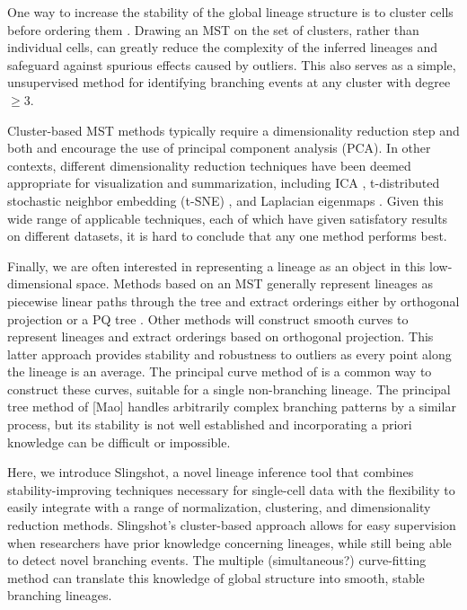 \documentclass[11pt]{article}\usepackage[]{graphicx}\usepackage[]{color}
\begin{document}
One way to increase the stability of the global lineage structure is to cluster cells before ordering them \citep{Ji&Ji16,Shinetal15}. Drawing an MST on the set of clusters, rather than individual cells, can greatly reduce the complexity of the inferred lineages and safeguard against spurious effects caused by outliers. This also serves as a simple, unsupervised method for identifying branching events at any cluster with degree $\geq 3$.

 Cluster-based MST methods typically require a dimensionality reduction step and both \citet{Ji&Ji16} and \citet{Shinetal15} encourage the use of principal component analysis (PCA). In other contexts, different dimensionality reduction techniques have been deemed appropriate for visualization and summarization, including ICA \citep{Trapnelletal14}, t-distributed stochastic neighbor embedding (t-SNE) \citep{Bendalletal14,Petropoulosetal16}, and Laplacian eigenmaps \citep{Campbelletal15}. Given this wide range of applicable techniques, each of which have given satisfatory results on different datasets, it is hard to conclude that any one method performs best.

 Finally, we are often interested in representing a lineage as an object in this low-dimensional space. Methods based on an MST generally represent lineages as piecewise linear paths through the tree and extract orderings either by orthogonal projection \citep{Ji&Ji16,Shinetal15} or a PQ tree \citep{Trapnelletal14}. Other methods will construct smooth curves to represent lineages \citep{Campbelletal15,Petropoulosetal16} and extract orderings based on orthogonal projection. This latter approach provides stability and robustness to outliers as every point along the lineage is an average. The principal curve method of \citet{Hastie&Stuetzle89} is a common way to construct these curves, suitable for a single non-branching lineage. The principal tree method of [Mao] handles arbitrarily complex branching patterns by a similar process, but its stability is not well established and incorporating a priori knowledge can be difficult or impossible.

 Here, we introduce Slingshot, a novel lineage inference tool that combines stability-improving techniques necessary for single-cell data with the flexibility to easily integrate with a range of normalization, clustering, and dimensionality reduction methods. Slingshot's cluster-based approach allows for easy supervision when researchers have prior knowledge concerning lineages, while still being able to detect novel branching events. The multiple (simultaneous?) curve-fitting method can translate this knowledge of global structure into smooth, stable branching lineages.
\end{document}
